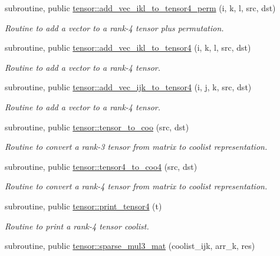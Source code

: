 \begin{DoxyCompactItemize}
subroutine, public \hyperlink{namespacetensor_a9e443c5b0f095efdbb0df2e876b760be}{tensor\+::add\+\_\+vec\+\_\+ikl\+\_\+to\+\_\+tensor4\+\_\+perm} (i, k, l, src, dst)
\begin{DoxyCompactList}\small\item\em Routine to add a vector to a rank-\/4 tensor plus permutation. \end{DoxyCompactList}\item 
subroutine, public \hyperlink{namespacetensor_a4dd51ee85d6dffa3350880defc9823e8}{tensor\+::add\+\_\+vec\+\_\+ikl\+\_\+to\+\_\+tensor4} (i, k, l, src, dst)
\begin{DoxyCompactList}\small\item\em Routine to add a vector to a rank-\/4 tensor. \end{DoxyCompactList}\item 
subroutine, public \hyperlink{namespacetensor_adfadc0660ec0e87b9d0dd3c383919d6b}{tensor\+::add\+\_\+vec\+\_\+ijk\+\_\+to\+\_\+tensor4} (i, j, k, src, dst)
\begin{DoxyCompactList}\small\item\em Routine to add a vector to a rank-\/4 tensor. \end{DoxyCompactList}\item 
subroutine, public \hyperlink{namespacetensor_a39f5944ef78c2d2aaac59477d8c6848f}{tensor\+::tensor\+\_\+to\+\_\+coo} (src, dst)
\begin{DoxyCompactList}\small\item\em Routine to convert a rank-\/3 tensor from matrix to coolist representation. \end{DoxyCompactList}\item 
subroutine, public \hyperlink{namespacetensor_ae8308730212d86ee401775f02f631310}{tensor\+::tensor4\+\_\+to\+\_\+coo4} (src, dst)
\begin{DoxyCompactList}\small\item\em Routine to convert a rank-\/4 tensor from matrix to coolist representation. \end{DoxyCompactList}\item 
subroutine, public \hyperlink{namespacetensor_acb57d076f51b89419e4e8254ce13dd62}{tensor\+::print\+\_\+tensor4} (t)
\begin{DoxyCompactList}\small\item\em Routine to print a rank-\/4 tensor coolist. \end{DoxyCompactList}\item 
subroutine, public \hyperlink{namespacetensor_a08965e1040a94fc58c1efa9ff9639118}{tensor\+::sparse\+\_\+mul3\+\_\+mat} (coolist\+\_\+ijk, arr\+\_\+k, res)

\end{DoxyCompactItemize}
